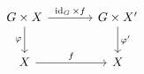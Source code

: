 \documentclass{article}
\begin{document}
    \begin{equation*}
        \begin{tikzcd}[column sep = 0.5in, row sep = 0.3in]
            G\times X \ar[r, "\id_G\times f"] \ar[d, "\phi"'] & G\times X' \ar[d, "\phi'"] \\
            X \ar[r, "f"] & X
        \end{tikzcd}
    \end{equation*}
\end{document}

